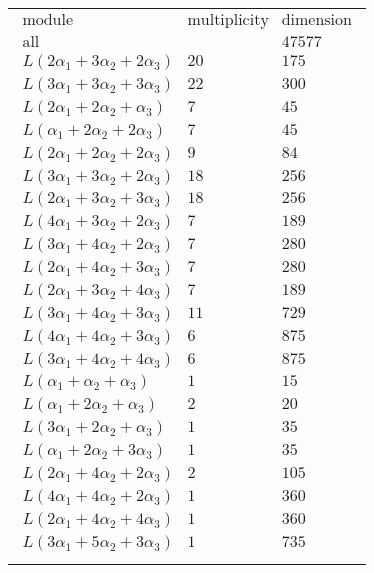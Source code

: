 \documentclass[crop,border=2mm]{standalone}
\begin{document}
\begin{tabular}{l}
$\displaystyle
\begin{array}{rll}
	\text{module}&\text{multiplicity}&\text{dimension} \\ \hline \text{all}&&47577 \\
	L\left( 2\alpha_{1}+ 3\alpha_{2}+ 2\alpha_{3}\right)&20&175\\
	L\left( 3\alpha_{1}+ 3\alpha_{2}+ 3\alpha_{3}\right)&22&300\\
	L\left( 2\alpha_{1}+ 2\alpha_{2}+\alpha_{3}\right)&7&45\\
	L\left(\alpha_{1}+ 2\alpha_{2}+ 2\alpha_{3}\right)&7&45\\
	L\left( 2\alpha_{1}+ 2\alpha_{2}+ 2\alpha_{3}\right)&9&84\\
	L\left( 3\alpha_{1}+ 3\alpha_{2}+ 2\alpha_{3}\right)&18&256\\
	L\left( 2\alpha_{1}+ 3\alpha_{2}+ 3\alpha_{3}\right)&18&256\\
	L\left( 4\alpha_{1}+ 3\alpha_{2}+ 2\alpha_{3}\right)&7&189\\
	L\left( 3\alpha_{1}+ 4\alpha_{2}+ 2\alpha_{3}\right)&7&280\\
	L\left( 2\alpha_{1}+ 4\alpha_{2}+ 3\alpha_{3}\right)&7&280\\
	L\left( 2\alpha_{1}+ 3\alpha_{2}+ 4\alpha_{3}\right)&7&189\\
	L\left( 3\alpha_{1}+ 4\alpha_{2}+ 3\alpha_{3}\right)&11&729\\
	L\left( 4\alpha_{1}+ 4\alpha_{2}+ 3\alpha_{3}\right)&6&875\\
	L\left( 3\alpha_{1}+ 4\alpha_{2}+ 4\alpha_{3}\right)&6&875\\
	L\left(\alpha_{1}+\alpha_{2}+\alpha_{3}\right)&1&15\\
	L\left(\alpha_{1}+ 2\alpha_{2}+\alpha_{3}\right)&2&20\\
	L\left( 3\alpha_{1}+ 2\alpha_{2}+\alpha_{3}\right)&1&35\\
	L\left(\alpha_{1}+ 2\alpha_{2}+ 3\alpha_{3}\right)&1&35\\
	L\left( 2\alpha_{1}+ 4\alpha_{2}+ 2\alpha_{3}\right)&2&105\\
	L\left( 4\alpha_{1}+ 4\alpha_{2}+ 2\alpha_{3}\right)&1&360\\
	L\left( 2\alpha_{1}+ 4\alpha_{2}+ 4\alpha_{3}\right)&1&360\\
	L\left( 3\alpha_{1}+ 5\alpha_{2}+ 3\alpha_{3}\right)&1&735
\end{array}
$ \\ \\

\end{tabular}
\end{document}
